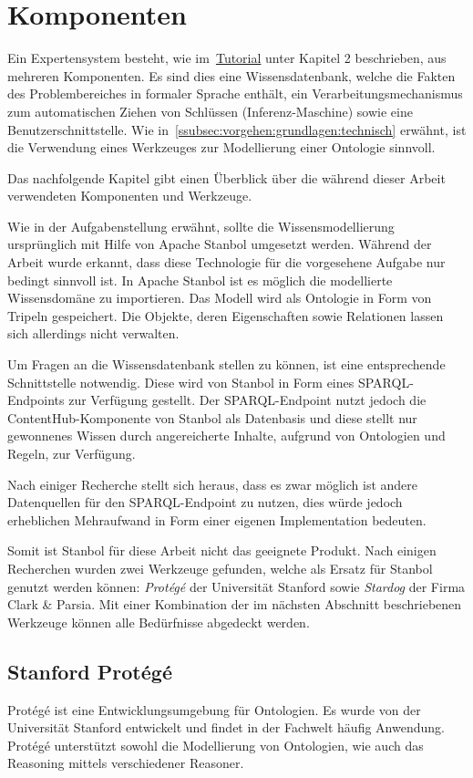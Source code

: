 \chapter{Komponenten}
\label{chap:komponenten}

Ein Expertensystem besteht, wie im~\hyperref[sec:anhang:tutorial_dokument]{Tutorial} unter Kapitel 2 beschrieben, aus mehreren Komponenten. Es sind dies eine Wissensdatenbank, welche die Fakten des Problembereiches in formaler Sprache enthält, ein Verarbeitungsmechanismus zum automatischen Ziehen von Schlüssen (Inferenz-Maschine) sowie eine Benutzerschnittstelle. Wie in~\autoref{ssubsec:vorgehen:grundlagen:technisch} erwähnt, ist die Verwendung eines Werkzeuges zur Modellierung einer Ontologie sinnvoll.

Das nachfolgende Kapitel gibt einen Überblick über die während dieser Arbeit verwendeten Komponenten und Werkzeuge.

Wie in der Aufgabenstellung erwähnt, sollte die Wissensmodellierung ursprünglich mit Hilfe von Apache Stanbol umgesetzt werden. Während der Arbeit wurde erkannt, dass diese Technologie für die vorgesehene Aufgabe nur bedingt sinnvoll ist. In Apache Stanbol ist es möglich die modellierte Wissensdomäne zu importieren. Das Modell wird als Ontologie in Form von Tripeln gespeichert. Die Objekte, deren Eigenschaften sowie Relationen lassen sich allerdings nicht verwalten.

Um Fragen an die Wissensdatenbank stellen zu können, ist eine entsprechende Schnittstelle notwendig. Diese wird von Stanbol in Form eines SPARQL-Endpoints zur Verfügung gestellt. Der SPARQL-Endpoint nutzt jedoch die ContentHub-Komponente von Stanbol als Datenbasis und diese stellt nur gewonnenes Wissen durch angereicherte Inhalte, aufgrund von Ontologien und Regeln, zur Verfügung.

Nach einiger Recherche stellt sich heraus, dass es zwar möglich ist andere Datenquellen für den SPARQL-Endpoint zu nutzen, dies würde jedoch erheblichen Mehraufwand in Form einer eigenen Implementation bedeuten.

Somit ist Stanbol für diese Arbeit nicht das geeignete Produkt. Nach einigen Recherchen wurden zwei Werkzeuge gefunden, welche als Ersatz für Stanbol genutzt werden können: \textit{Protégé} der Universität Stanford sowie \textit{Stardog} der Firma Clark \& Parsia. Mit einer Kombination der im nächsten Abschnitt beschriebenen Werkzeuge können alle Bedürfnisse abgedeckt werden.


\section{Stanford Protégé}
\label{sec:komponenten_protege}
Protégé ist eine Entwicklungsumgebung für Ontologien. Es wurde von der Universität Stanford entwickelt und findet in der Fachwelt häufig Anwendung. Protégé unterstützt sowohl die Modellierung von Ontologien, wie auch das Reasoning mittels verschiedener Reasoner.

